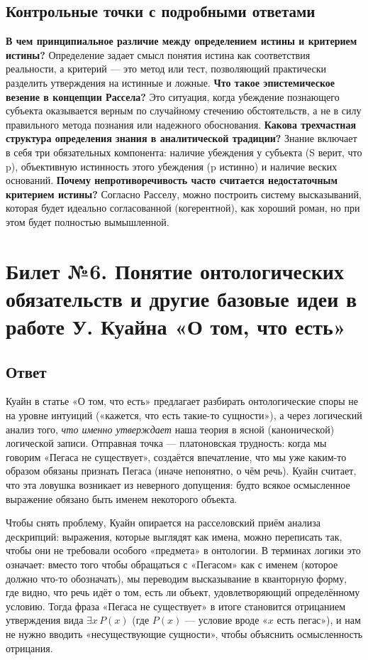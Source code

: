 \documentclass[a4paper,12pt]{article}
\begin{document}
\subsection{Контрольные точки с подробными ответами}

\textbf{В чем принципиальное различие между определением истины и критерием истины?}
Определение задает смысл понятия истина как соответствия реальности, а критерий — это метод или тест, позволяющий практически разделить утверждения на истинные и ложные.
\textbf{Что такое эпистемическое везение в концепции Рассела?}
Это ситуация, когда убеждение познающего субъекта оказывается верным по случайному стечению обстоятельств, а не в силу правильного метода познания или надежного обоснования.
\textbf{Какова трехчастная структура определения знания в аналитической традиции?}
Знание включает в себя три обязательных компонента: наличие убеждения у субъекта (S верит, что p), объективную истинность этого убеждения (p истинно) и наличие веских оснований.
\textbf{Почему непротиворечивость часто считается недостаточным критерием истины?}
Согласно Расселу, можно построить систему высказываний, которая будет идеально согласованной (когерентной), как хороший роман, но при этом будет полностью вымышленной.


\newpage
\section{Билет №6. Понятие онтологических обязательств и другие базовые идеи в работе У. Куайна «О том, что есть»}

\subsection{Ответ}

Куайн в статье «О том, что есть» предлагает разбирать онтологические споры не на уровне интуиций («кажется, что есть такие-то сущности»), а через логический анализ того, \emph{что именно утверждает} наша теория в ясной (канонической) логической записи. Отправная точка --- платоновская трудность: когда мы говорим «Пегаса не существует», создаётся впечатление, что мы уже каким-то образом обязаны признать Пегаса (иначе непонятно, о чём речь). Куайн считает, что эта ловушка возникает из неверного допущения: будто всякое осмысленное выражение обязано быть именем некоторого объекта.

Чтобы снять проблему, Куайн опирается на расселовский приём анализа дескрипций: выражения, которые выглядят как имена, можно переписать так, чтобы они не требовали особого «предмета» в онтологии. В терминах логики это означает: вместо того чтобы обращаться с «Пегасом» как с именем (которое должно что-то обозначать), мы переводим высказывание в кванторную форму, где видно, что речь идёт о том, есть ли объект, удовлетворяющий определённому условию. Тогда фраза «Пегаса не существует» в итоге становится отрицанием утверждения вида $\exists x\, P(x)$ (где $P(x)$ --- условие вроде «$x$ есть пегас»), и нам не нужно вводить «несуществующие сущности», чтобы объяснить осмысленность отрицания.
\end{document}
